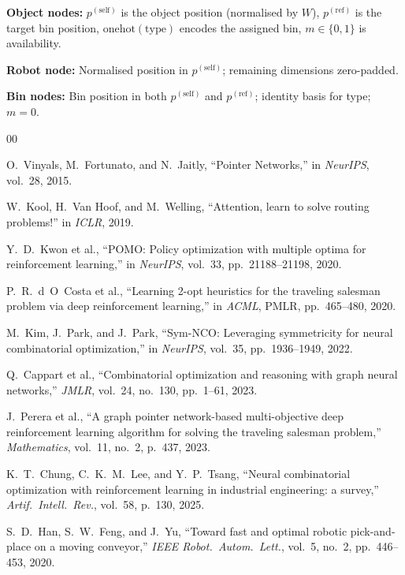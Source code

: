 \documentclass[conference]{IEEEtran}
\begin{document}
\textbf{Object nodes:} $p^{(\text{self})}$ is the object position (normalised by $W$), $p^{(\text{ref})}$ is the target bin position, $\text{onehot}(\text{type})$ encodes the assigned bin, $m \in \{0,1\}$ is availability.

\textbf{Robot node:} Normalised position in $p^{(\text{self})}$; remaining dimensions zero-padded.

\textbf{Bin nodes:} Bin position in both $p^{(\text{self})}$ and $p^{(\text{ref})}$; identity basis for type; $m{=}0$.

\begin{thebibliography}{00}

 O.~Vinyals, M.~Fortunato, and N.~Jaitly, ``Pointer Networks,'' in \emph{NeurIPS}, vol.~28, 2015.

 W.~Kool, H.~Van Hoof, and M.~Welling, ``Attention, learn to solve routing problems!'' in \emph{ICLR}, 2019.

 Y.~D.~Kwon et al., ``POMO: Policy optimization with multiple optima for reinforcement learning,'' in \emph{NeurIPS}, vol.~33, pp.~21188--21198, 2020.

 P.~R.~d~O~Costa et al., ``Learning 2-opt heuristics for the traveling salesman problem via deep reinforcement learning,'' in \emph{ACML}, PMLR, pp.~465--480, 2020.

 M.~Kim, J.~Park, and J.~Park, ``Sym-NCO: Leveraging symmetricity for neural combinatorial optimization,'' in \emph{NeurIPS}, vol.~35, pp.~1936--1949, 2022.

 Q.~Cappart et al., ``Combinatorial optimization and reasoning with graph neural networks,'' \emph{JMLR}, vol.~24, no.~130, pp.~1--61, 2023.

 J.~Perera et al., ``A graph pointer network-based multi-objective deep reinforcement learning algorithm for solving the traveling salesman problem,'' \emph{Mathematics}, vol.~11, no.~2, p.~437, 2023.

 K.~T.~Chung, C.~K.~M.~Lee, and Y.~P.~Tsang, ``Neural combinatorial optimization with reinforcement learning in industrial engineering: a survey,'' \emph{Artif.\ Intell.\ Rev.}, vol.~58, p.~130, 2025.

 S.~D.~Han, S.~W.~Feng, and J.~Yu, ``Toward fast and optimal robotic pick-and-place on a moving conveyor,'' \emph{IEEE Robot.\ Autom.\ Lett.}, vol.~5, no.~2, pp.~446--453, 2020.


\end{thebibliography}
\end{document}

